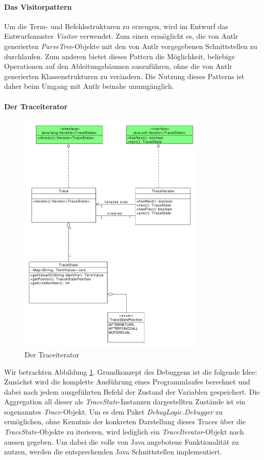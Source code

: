 \documentclass[parskip=full]{scrartcl}
\begin{document}
\paragraph{Das Visitorpattern}
Um die Term- und Befehlsstrukturen zu erzeugen, wird im Entwurf das Entwurfsmuster \textit{Visitor} verwendet. Zum einen ermöglicht es, die von Antlr generierten \textit{ParseTree}-Objekte mit den von Antlr vorgegebenen Schnittstellen zu durchlaufen. Zum anderen bietet dieses Pattern die Möglichkeit, beliebige Operationen auf den Ableitungsbäumen auszuführen, ohne die von Antlr generierten Klassenstrukturen zu verändern. Die Nutzung dieses Patterns ist daher beim Umgang mit Antlr beinahe unumgänglich.
\paragraph{Der Traceiterator}
\begin{figure}[!h]
\centering
\includegraphics[width=0.8\textwidth]{diagrammIdeenUmlet/TraceIteratorPattern.pdf}
\caption{Der Traceiterator}
\label{TraceIterator}
\end{figure}
Wir betrachten Abbildung \ref{TraceIterator}.
Grundkonzept des Debuggens ist die folgende Idee: Zunächst wird die komplette Ausführung eines Programmlaufes berechnet und dabei nach jedem ausgeführten Befehl der Zustand der Variablen gespeichert. Die Aggregation all dieser als \textit{TraceState}-Instanzen dargestellten Zustände ist ein sogenanntes \textit{Trace}-Objekt. Um es dem Paket \textit{DebugLogic.Debugger} zu ermöglichen, ohne Kenntnis der konkreten Darstellung dieses Traces über die \textit{TraceState}-Objekte zu iterieren, wird lediglich ein \textit{TraceIterator}-Objekt nach aussen gegeben. Um dabei die volle von Java angebotene Funktionalität zu nutzen, werden die entsprechenden Java Schnittstellen implementiert. 
\end{document}
